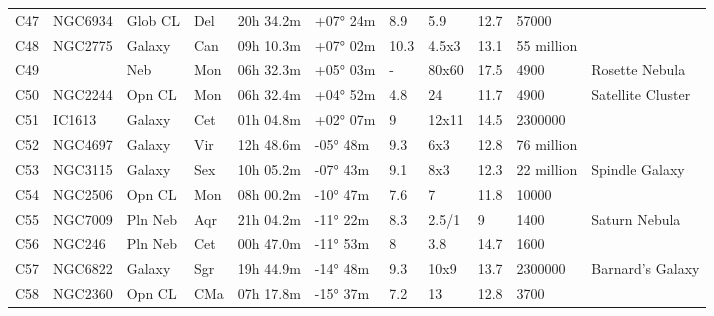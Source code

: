 \begin{table}[h]
\begin{tabular}{@{}lllllllllll@{}}
C47        & NGC6934     & Glob CL    & Del       & 20h 34.2m & +07° 24m  & 8.9       & 5.9                  & 12.7     & 57000               &                                 \\
C48        & NGC2775     & Galaxy     & Can       & 09h 10.3m & +07° 02m  & 10.3      & 4.5x3                & 13.1     & 55 million          &                                 \\
C49        &             & Neb        & Mon       & 06h 32.3m & +05° 03m  & -         & 80x60                & 17.5     & 4900                & Rosette Nebula                  \\
C50        & NGC2244     & Opn CL     & Mon       & 06h 32.4m & +04° 52m  & 4.8       & 24                   & 11.7     & 4900                & Satellite Cluster               \\
C51        & IC1613      & Galaxy     & Cet       & 01h 04.8m & +02° 07m  & 9         & 12x11                & 14.5     & 2300000             &                                 \\
C52        & NGC4697     & Galaxy     & Vir       & 12h 48.6m & -05° 48m  & 9.3       & 6x3                  & 12.8     & 76 million          &                                 \\
C53        & NGC3115     & Galaxy     & Sex       & 10h 05.2m & -07° 43m  & 9.1       & 8x3                  & 12.3     & 22 million          & Spindle Galaxy                  \\
C54        & NGC2506     & Opn CL     & Mon       & 08h 00.2m & -10° 47m  & 7.6       & 7                    & 11.8     & 10000               &                                 \\
C55        & NGC7009     & Pln Neb    & Aqr       & 21h 04.2m & -11° 22m  & 8.3       & 2.5/1                & 9        & 1400                & Saturn Nebula                   \\
C56        & NGC246      & Pln Neb    & Cet       & 00h 47.0m & -11° 53m  & 8         & 3.8                  & 14.7     & 1600                &                                 \\
C57        & NGC6822     & Galaxy     & Sgr       & 19h 44.9m & -14° 48m  & 9.3       & 10x9                 & 13.7     & 2300000             & Barnard's Galaxy                \\
C58        & NGC2360     & Opn CL     & CMa       & 07h 17.8m & -15° 37m  & 7.2       & 13                   & 12.8     & 3700                &                                 \\

\end{tabular}
\end{table}

